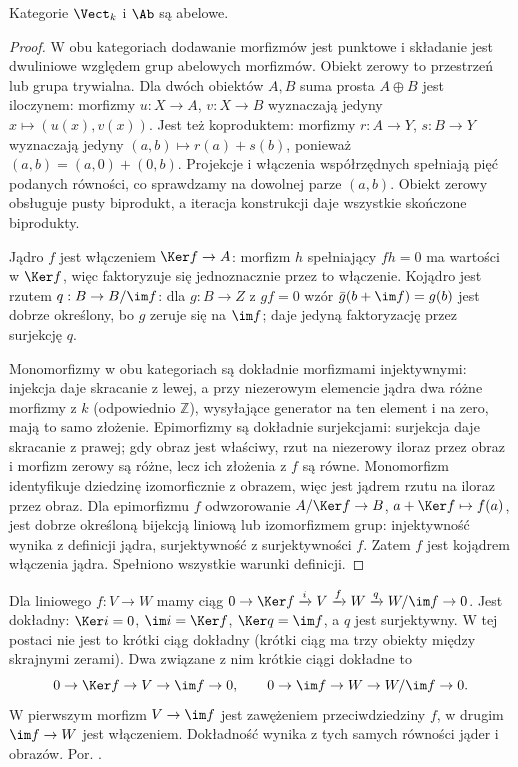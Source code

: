 \begin{stwierdzenie}\label{cat:prop:abelian-examples}
Kategorie $\Vect_k$ i $\Ab$ są abelowe.
\end{stwierdzenie}
\begin{proof}
W obu kategoriach dodawanie morfizmów jest punktowe i składanie jest dwuliniowe względem grup abelowych morfizmów. Obiekt zerowy to przestrzeń lub grupa trywialna. Dla dwóch obiektów $A,B$ suma prosta $A\oplus B$ jest iloczynem: morfizmy $u:X\to A$, $v:X\to B$ wyznaczają jedyny $x\mapsto(u(x),v(x))$. Jest też koproduktem: morfizmy $r:A\to Y$, $s:B\to Y$ wyznaczają jedyny $(a,b)\mapsto r(a)+s(b)$, ponieważ $(a,b)=(a,0)+(0,b)$. Projekcje i włączenia współrzędnych spełniają pięć podanych równości, co sprawdzamy na dowolnej parze $(a,b)$. Obiekt zerowy obsługuje pusty biprodukt, a iteracja konstrukcji daje wszystkie skończone biprodukty.

Jądro $f$ jest włączeniem $\Ker f\to A$: morfizm $h$ spełniający $fh=0$ ma wartości w $\Ker f$, więc faktoryzuje się jednoznacznie przez to włączenie. Kojądro jest rzutem $q:B\to B/\im f$: dla $g:B\to Z$ z $gf=0$ wzór $\bar g(b+\im f)=g(b)$ jest dobrze określony, bo $g$ zeruje się na $\im f$; daje jedyną faktoryzację przez surjekcję $q$.

Monomorfizmy w obu kategoriach są dokładnie morfizmami injektywnymi: injekcja daje skracanie z lewej, a przy niezerowym elemencie jądra dwa różne morfizmy z $k$ (odpowiednio $\mathbb Z$), wysyłające generator na ten element i na zero, mają to samo złożenie. Epimorfizmy są dokładnie surjekcjami: surjekcja daje skracanie z prawej; gdy obraz jest właściwy, rzut na niezerowy iloraz przez obraz i morfizm zerowy są różne, lecz ich złożenia z $f$ są równe. Monomorfizm identyfikuje dziedzinę izomorficznie z obrazem, więc jest jądrem rzutu na iloraz przez obraz. Dla epimorfizmu $f$ odwzorowanie $A/\Ker f\to B$, $a+\Ker f\mapsto f(a)$, jest dobrze określoną bijekcją liniową lub izomorfizmem grup: injektywność wynika z definicji jądra, surjektywność z surjektywności $f$. Zatem $f$ jest kojądrem włączenia jądra. Spełniono wszystkie warunki definicji.
\end{proof}

\begin{przyklad}\label{cat:ex:exact-sequence}
Dla liniowego $f:V\to W$ mamy ciąg $0\to\Ker f\xrightarrow{i}V\xrightarrow{f}W\xrightarrow{q}W/\im f\to0$. Jest dokładny: $\Ker i=0$, $\im i=\Ker f$, $\Ker q=\im f$, a $q$ jest surjektywny. W tej postaci nie jest to krótki ciąg dokładny (krótki ciąg ma trzy obiekty między skrajnymi zerami). Dwa związane z nim krótkie ciągi dokładne to
\[
0\to\Ker f\to V\to\im f\to0,\qquad
0\to\im f\to W\to W/\im f\to0.
\]
W pierwszym morfizm $V\to\im f$ jest zawężeniem przeciwdziedziny $f$, w drugim $\im f\to W$ jest włączeniem. Dokładność wynika z tych samych równości jąder i obrazów. Por. .
\end{przyklad}


